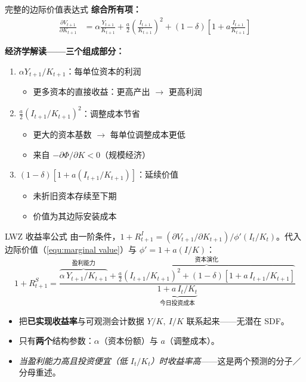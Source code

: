 \documentclass{beamer}
\begin{document}
\begin{frame}{完整的边际价值表达式}
    \textbf{综合所有项：}
    \begin{equation}\label{equ:marginal value}
        \boxed{
        \begin{aligned}
            \frac{\partial V_{t+1}}{\partial K_{t+1}} &= \alpha \frac{Y_{t+1}}{K_{t+1}} + \frac{a}{2}\left(\frac{I_{t+1}}{K_{t+1}}\right)^2 + (1-\delta)\left[1 + a\frac{I_{t+1}}{K_{t+1}}\right]
        \end{aligned}
        }
    \end{equation}


    \textbf{经济学解读——三个组成部分：}
    \begin{enumerate}
        \item $\alpha Y_{t+1}/K_{t+1}$：每单位资本的利润
        \begin{itemize}
            \item 更多资本的直接收益：更高产出 $\rightarrow$ 更高利润
        \end{itemize}

        \item $\frac{a}{2}(I_{t+1}/K_{t+1})^2$：调整成本节省
        \begin{itemize}
            \item 更大的资本基数 $\rightarrow$ 每单位调整成本更低
            \item 来自 $-\partial \Phi/\partial K < 0$（规模经济）
        \end{itemize}

        \item $(1-\delta)[1 + a(I_{t+1}/K_{t+1})]$：延续价值
        \begin{itemize}
            \item 未折旧资本存续至下期
            \item 价值为其边际安装成本
        \end{itemize}
    \end{enumerate}
\end{frame}

\begin{frame}{LWZ 收益率公式}
	由一阶条件，$1+R^I_{t+1}=(\partial V_{t+1}/\partial K_{t+1})/\phi'(I_t/K_t)$。代入边际价值（\ref{equ:marginal value}）与 $\phi'=1+a(I/K)$：
	\begin{equation}\label{equ:lwz return}
		\boxed{\,1+R^S_{t+1}=\frac{\overbrace{\alpha\,Y_{t+1}/K_{t+1}}^{\text{盈利能力}}+\overbrace{\tfrac a2(I_{t+1}/K_{t+1})^2+(1-\delta)\left[1+a\,I_{t+1}/K_{t+1}\right]}^{\text{资本演化}}}{\underbrace{1+a\,I_t/K_t}_{\text{今日投资成本}}}\,}
	\end{equation}
	\begin{itemize}
		\item 把\textbf{已实现收益率}与可观测会计数据 $Y/K,\ I/K$ 联系起来——无潜在 SDF。
		\item 只有\textbf{两个}结构参数：$\alpha$（资本份额）与 $a$（调整成本）。
		\item \textit{当盈利能力高且投资便宜（低 $I_t/K_t$）时收益率高}——这是两个预测的分子／分母重述。
	\end{itemize}
\end{frame}
\end{document}
